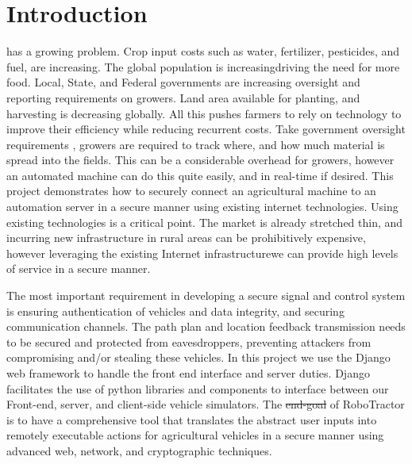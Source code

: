 \documentclass[conference,12pt]{IEEEtran}
\providecommand{\DIFaddtex}[1]{{\protect\color{blue}\uwave{#1}}} %
\providecommand{\DIFdeltex}[1]{{\protect\color{red}\sout{#1}}}                      %
\providecommand{\DIFaddbegin}{} %
\providecommand{\DIFaddend}{} %
\providecommand{\DIFdelbegin}{} %
\providecommand{\DIFdelend}{} %
\providecommand{\DIFadd}[1]{\texorpdfstring{\DIFaddtex{#1}}{#1}} %
\providecommand{\DIFdel}[1]{\texorpdfstring{\DIFdeltex{#1}}{}} %
\begin{document}
\section{Introduction}
 has a growing problem. Crop input costs such as water,
fertilizer, pesticides, and fuel, are increasing. The global population is
increasing\DIFaddbegin \DIFadd{, }\DIFaddend driving the need for more food. Local, State, and Federal governments
are increasing oversight and reporting requirements on growers. Land area
available for planting, and harvesting is decreasing globally. All this pushes
farmers to rely on technology to improve their efficiency while reducing
recurrent costs. Take government oversight requirements
\autocite{_growers_oversight}, growers are required to track where, and how much
material is spread into the fields.  This can be a considerable overhead for
growers, however an automated machine can do this quite easily, and in real-time
if desired.  This project demonstrates how to securely connect an agricultural
machine to an automation server in a secure manner using existing internet
technologies. Using existing technologies is a critical point. The market is
already stretched thin, and incurring new infrastructure in rural areas can be
prohibitively expensive, however leveraging the existing Internet infrastructure\DIFaddbegin \DIFadd{, }\DIFaddend we
can provide high levels of service in a secure manner.

The most important requirement in developing a secure signal and control system is ensuring authentication of vehicles and data integrity, and securing communication channels. The path plan and location feedback transmission needs to be secured and protected from eavesdroppers, preventing attackers from compromising and/or stealing these vehicles. In this project we use the Django web framework to handle the front end interface and server duties. Django facilitates the use of python libraries and components to interface between our Front-end, server, and client-side vehicle simulators. The \DIFdelbegin \DIFdel{end-goal }\DIFdelend \DIFaddbegin \DIFadd{end goal }\DIFaddend of RoboTractor is to have a comprehensive tool that translates the abstract user inputs into remotely executable actions for agricultural vehicles in a secure manner using advanced web, network, and cryptographic techniques.
\end{document}
